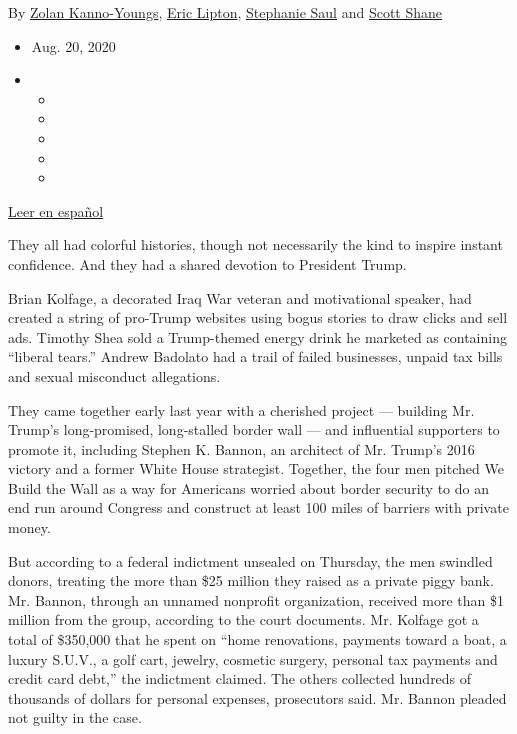 By \href{https://www.nytimes3xbfgragh.onion/by/zolan-kanno-youngs}{Zolan
Kanno-Youngs},
\href{https://www.nytimes3xbfgragh.onion/by/eric-lipton}{Eric Lipton},
\href{https://www.nytimes3xbfgragh.onion/by/stephanie-saul}{Stephanie
Saul} and \href{https://www.nytimes3xbfgragh.onion/by/scott-shane}{Scott
Shane}

\begin{itemize}
\item
  Aug. 20, 2020
\item
  \begin{itemize}
  \item
  \item
  \item
  \item
  \item
  \end{itemize}
\end{itemize}

\href{https://www.nytimes3xbfgragh.onion/es/2020/08/21/espanol/estados-unidos/steve-bannon-muro-fraude.html}{Leer
en español}

They all had colorful histories, though not necessarily the kind to
inspire instant confidence. And they had a shared devotion to President
Trump.

Brian Kolfage, a decorated Iraq War veteran and motivational speaker,
had created a string of pro-Trump websites using bogus stories to draw
clicks and sell ads. Timothy Shea sold a Trump-themed energy drink he
marketed as containing ``liberal tears.'' Andrew Badolato had a trail of
failed businesses, unpaid tax bills and sexual misconduct allegations.

They came together early last year with a cherished project --- building
Mr. Trump's long-promised, long-stalled border wall --- and influential
supporters to promote it, including Stephen K. Bannon, an architect of
Mr. Trump's 2016 victory and a former White House strategist. Together,
the four men pitched We Build the Wall as a way for Americans worried
about border security to do an end run around Congress and construct at
least 100 miles of barriers with private money.

But according to a federal indictment unsealed on Thursday, the men
swindled donors, treating the more than \$25 million they raised as a
private piggy bank. Mr. Bannon, through an unnamed nonprofit
organization, received more than \$1 million from the group, according
to the court documents. Mr. Kolfage got a total of \$350,000 that he
spent on ``home renovations, payments toward a boat, a luxury S.U.V., a
golf cart, jewelry, cosmetic surgery, personal tax payments and credit
card debt,'' the indictment claimed. The others collected hundreds of
thousands of dollars for personal expenses, prosecutors said. Mr. Bannon
pleaded not guilty in the case.

